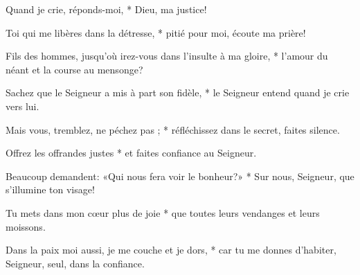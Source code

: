 \item Quand je crie, réponds-moi, * Dieu, ma justice!
\item Toi qui me libères dans la détresse, * pitié pour moi, écoute ma prière!
\item Fils des hommes, jusqu'où irez-vous dans l'insulte à ma gloire, * l'amour du néant et la course au mensonge?
\item Sachez que le Seigneur a mis à part son fidèle, * le Seigneur entend quand je crie vers lui.
\item Mais vous, tremblez, ne péchez pas ; * réfléchissez dans le secret, faites silence.
\item Offrez les offrandes justes * et faites confiance au Seigneur.
\item Beaucoup demandent: «Qui nous fera voir le bonheur?» * Sur nous, Seigneur, que s'illumine ton visage!
\item Tu mets dans mon cœur plus de joie * que toutes leurs vendanges et leurs moissons.
\item Dans la paix moi aussi, je me couche et je dors, * car tu me donnes d'habiter, Seigneur, seul, dans la confiance.
